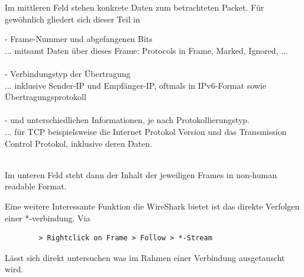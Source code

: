 \documentclass[11pt]{article}
\begin{document}
    Im mittleren Feld stehen konkrete Daten zum betrachteten Packet.
    Für gewöhnlich gliedert sich dieser Teil in
    \begin{addmargin}[1em]{1em}
        - Frame-Nummer und abgefangenen Bits\\
        ... mitsamt Daten über dieses Frame: Protocols in Frame, Marked, Ignored, ...\\\\
        - Verbindungstyp der Übertragung\\
        ... inklusive Sender-IP und Empfänger-IP, oftmals in IPv6-Format sowie Übertragungsprotokoll\\\\
        - und unterschiedlichen Informationen, je nach Protokollierungstyp.\\
        ... für TCP beispielsweise die Internet Protokol Version und das Transmission Control Protokol, inklusive deren Daten.\\\\
    \end{addmargin}

    Im unteren Feld steht dann der Inhalt der jeweiligen Frames in non-human readable Format.

    Eine weitere Interessante Funktion die WireShark bietet ist das direkte Verfolgen einer *-verbindung. Via
    \begin{verbatim}
        > Rightclick on Frame > Follow > *-Stream
    \end{verbatim}
    Lässt sich direkt untersuchen was im Rahmen einer Verbindung ausgetauscht wird.

    \noindent{}
\end{document}
